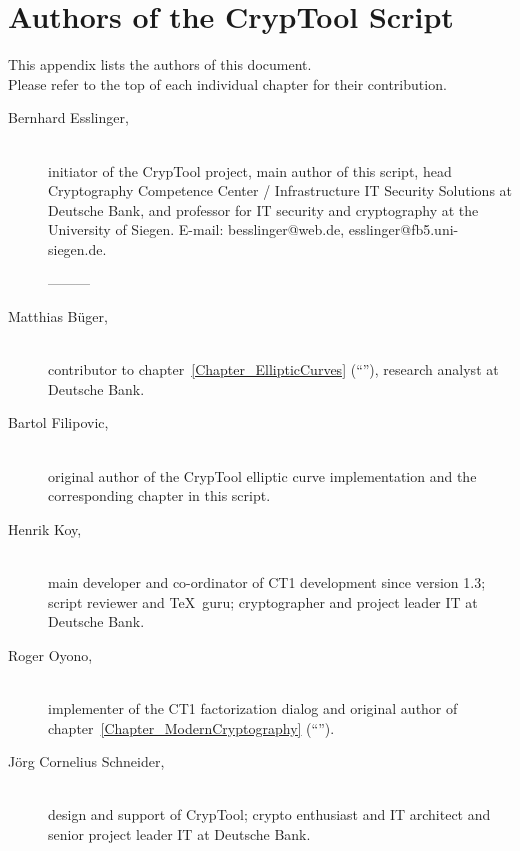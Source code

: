 \newpage
\hypertarget{appendix-authors}{}
\section{Authors of the CrypTool Script}
\label{s:appendix-authors}

This appendix lists the authors of this document.\\
Please refer to the top of each individual chapter for their contribution.

\begin{description}

\item[Bernhard Esslinger,] \mbox{}\\
initiator of the CrypTool project, main author of this script, head Cryptography Competence Center / Infrastructure IT Security Solutions at Deutsche Bank, and professor for IT security and cryptography at the University of Siegen.
E-mail: besslinger@web.de, esslinger@fb5.uni-siegen.de.

---------

\item[Matthias B\"uger,] \mbox{}\\ 
contributor to chapter~\ref{Chapter_EllipticCurves} (``''),
research analyst at Deutsche Bank.

\item[Bartol Filipovic,] \mbox{}\\
original author of the CrypTool elliptic curve
implementation and the corresponding chapter in this script.

\item[Henrik Koy, ] \mbox{}\\
main developer and co-ordinator of CT1 development
since version 1.3; script reviewer and \TeX\ guru; cryptographer 
and project leader IT at Deutsche Bank.

\item[Roger Oyono, ] \mbox{}\\
implementer of the CT1 factorization dialog and original author
of chapter~\ref{Chapter_ModernCryptography} (``'').

\item[J\"org Cornelius Schneider,] \mbox{}\\
design and support of CrypTool; crypto enthusiast and IT architect and
senior project leader IT at Deutsche Bank.


\end{description}
